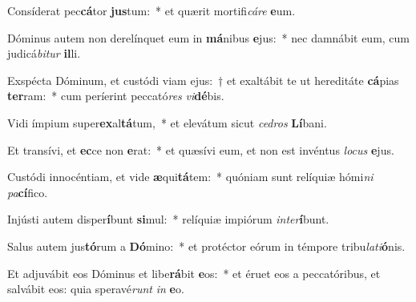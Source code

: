 \item Consíderat pec\textbf{cá}tor \textbf{jus}tum:~* et quærit mortifi\textit{cá}\textit{re} \textbf{e}um.
\item Dóminus autem non derelínquet eum in \textbf{má}nibus \textbf{e}jus:~* nec damnábit eum, cum judicá\textit{bi}\textit{tur} \textbf{il}li.
\item Exspécta Dóminum, et custódi viam ejus:~† et exaltábit te ut hereditáte \textbf{cá}pias \textbf{ter}ram:~* cum períerint peccató\textit{res} \textit{vi}\textbf{dé}bis.
\item Vidi ímpium super\textbf{ex}al\textbf{tá}tum,~* et elevátum sicut \textit{ce}\textit{dros} \textbf{Lí}bani.
\item Et transívi, et \textbf{ec}ce non \textbf{e}rat:~* et quæsívi eum, et non est invéntus \textit{lo}\textit{cus} \textbf{e}jus.
\item Custódi innocéntiam, et vide \textbf{æ}qui\textbf{tá}tem:~* quóniam sunt relíquiæ hómi\textit{ni} \textit{pa}\textbf{cí}fico.
\item Injústi autem disper\textbf{í}bunt \textbf{si}mul:~* relíquiæ impiórum \textit{in}\textit{ter}\textbf{í}bunt.
\item Salus autem jus\textbf{tó}rum a \textbf{Dó}mino:~* et protéctor eórum in témpore tribu\textit{la}\textit{ti}\textbf{ó}nis.
\item Et adjuvábit eos Dóminus et libe\textbf{rá}bit \textbf{e}os:~* et éruet eos a peccatóribus, et salvábit eos: quia speravé\textit{runt} \textit{in} \textbf{e}o.
